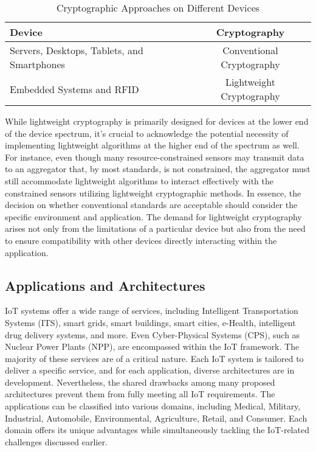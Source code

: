 \documentclass[conference,compsoc]{IEEEtran}
\begin{document}
\begin{table}[h]
    \centering
    \begin{tabular}{lc}
        \toprule
        \textbf{Device} & \textbf{Cryptography} \\
        \midrule
        Servers, Desktops, Tablets, and Smartphones & Conventional Cryptography \\
        Embedded Systems and RFID & Lightweight Cryptography \\
        \bottomrule
    \end{tabular}
    \caption{Cryptographic Approaches on Different Devices}
    \label{table:crypto_devices}
\end{table}

While lightweight cryptography is primarily designed for devices at the lower end of the device spectrum, it's crucial to acknowledge the potential necessity of implementing lightweight algorithms at the higher end of the spectrum as well. For instance, even though many resource-constrained sensors may transmit data to an aggregator that, by most standards, is not constrained, the aggregator must still accommodate lightweight algorithms to interact effectively with the constrained sensors utilizing lightweight cryptographic methods. In essence, the decision on whether conventional standards are acceptable should consider the specific environment and application. The demand for lightweight cryptography arises not only from the limitations of a particular device but also from the need to ensure compatibility with other devices directly interacting within the application.
\subsection{Applications and Architectures}
IoT systems offer a wide range of services, including Intelligent Transportation Systems (ITS), smart grids, smart buildings, smart cities, e-Health, intelligent drug delivery systems, and more. Even Cyber-Physical Systems (CPS), such as Nuclear Power Plants (NPP), are encompassed within the IoT framework. The majority of these services are of a critical nature. Each IoT system is tailored to deliver a specific service, and for each application, diverse architectures are in development. 
Nevertheless, the shared drawbacks among many proposed architectures prevent them from fully meeting all IoT requirements. The applications can be classified into various domains, including Medical, Military, Industrial, Automobile, Environmental, Agriculture, Retail, and Consumer. Each domain offers its unique advantages while simultaneously tackling the IoT-related challenges discussed earlier.
\end{document}

